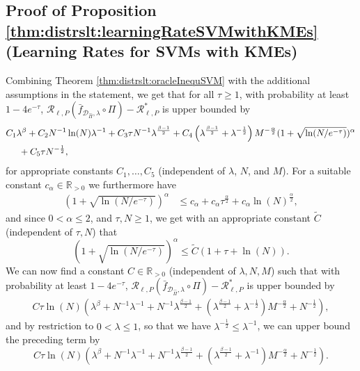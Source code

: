 \documentclass[letterpaper]{article} %
\newcommand{\R}{\mathbb{R}}
\newcommand{\Rp}{\R_{> 0}}
\newcommand{\dataSet}{\mathcal{D}}
\newcommand{\risk}{\mathcal{R}} %
\newcommand{\Risk}[2]{\risk_{{#1},{#2}}} %
\newcommand{\RiskBayes}[2]{\risk_{{#1},{#2}}^\ast} %
\newcommand{\hilbertianEmbed}{\Pi} %
\newcommand{\clipped}[1]{\bar{#1}}
\begin{document}
\subsection{Proof of Proposition \ref{thm:distrslt:learningRateSVMwithKMEs} (Learning Rates for SVMs with KMEs)} \label{sec:distrslt:proofOflearningRateSVMwithKMEs}
Combining Theorem \ref{thm:distrslt:oracleInequSVM} with the additional assumptions in the statement, we get that for all $\tau\geq 1$, with probability at least $1-4e^{-\tau}$, $ \Risk{\ell}{P}(\clipped{f}_{\dataSet_{\hat\hilbertianEmbed},\lambda} \circ \hilbertianEmbed) - \RiskBayes{\ell}{P}$
is upper bounded by 
\begin{align*}
    & C_1 \lambda^\beta + C_2 N^{-1}\ln(N) \lambda^{-1} + C_3 \tau N^{-1} \lambda^{\frac{\beta-1}{2}} 
    + C_4\left(\lambda^{\frac{\beta-1}{2}} + \lambda^{-\frac12}\right)M^{-\frac{\alpha}{2}}(1 + \sqrt{\ln(N/e^{-\tau})})^\alpha \\
    & \hspace{0.5cm} + C_5 \tau N^{-\frac12},
\end{align*} 
for appropriate constants $C_1,\ldots,C_5$ (independent of $\lambda$, $N$, and $M$).
For a suitable constant $c_\alpha \in \Rp$ we furthermore have
\begin{align*}
    (1 + \sqrt{\ln(N/e^{-\tau})})^\alpha & \leq c_\alpha + c_\alpha \tau^{\frac{\alpha}{2}} + c_\alpha \ln(N)^{\frac{\alpha}{2}},
\end{align*}
and since $0<\alpha\leq 2$, and $\tau,N\geq 1$, we get with an appropriate constant $\tilde C$ (independent of $\tau,N$) that
\begin{equation*}
    (1 + \sqrt{\ln(N/e^{-\tau})})^\alpha \leq \tilde C(1+\tau+\ln(N)).
\end{equation*}
We can now find a constant $C\in\Rp$ (independent of $\lambda,N,M$) such that with probability at least $1-4e^{-\tau}$, $\Risk{\ell}{P}(\clipped{f}_{\dataSet_{\hat\hilbertianEmbed},\lambda} \circ \hilbertianEmbed) - \RiskBayes{\ell}{P}$ is upper bounded by
\begin{align*}
    C \tau \ln(N)\left(\lambda^\beta + N^{-1} \lambda^{-1} + N^{-1}\lambda^{\frac{\beta-1}{2}} + (\lambda^{\frac{\beta-1}{2}}+\lambda^{-\frac12})M^{-\frac{\alpha}{2}} + N^{-\frac12} \right),
\end{align*}
and by restriction to $0<\lambda\leq 1$, so that we have $\lambda^{-\frac12} \leq \lambda^{-1}$, we can upper bound the preceding term by
\begin{equation*}
    C \tau \ln(N)\left(\lambda^\beta + N^{-1} \lambda^{-1} + N^{-1}\lambda^{\frac{\beta-1}{2}} + (\lambda^{\frac{\beta-1}{2}}+\lambda^{-1})M^{-\frac{\alpha}{2}} + N^{-\frac12} \right).
\end{equation*}
\end{document}
